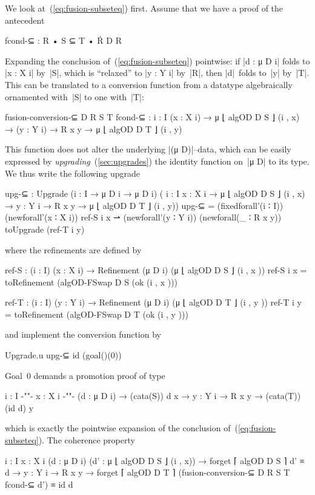 We look at~(\ref{eq:fusion-subseteq}) first.
Assume that we have a proof of the antecedent
\begin{code}
fcond-⊆ : R • S ⊆ T • Ṙ D R
\end{code}
Expanding the conclusion of~(\ref{eq:fusion-subseteq}) pointwise: if |d : μ D i| folds to |x : X i| by~|S|, which is ``relaxed'' to |y : Y i| by~|R|, then |d|~folds to~|y| by~|T|.
This can be translated to a conversion function from a datatype algebraically ornamented with~|S| to one with~|T|:
\begin{code}
fusion-conversion-⊆ D R S T fcond-⊆ :
  {i : I} (x : X i) → μ ⌊ algOD D S ⌋ (i , x) →
  (y : Y i) → R x y → μ ⌊ algOD D T ⌋ (i , y)
\end{code}
This function does not alter the underlying |(μ D)|--data, which can be easily expressed by \emph{upgrading}~(\autoref{sec:upgrades}) the identity function on~|μ D| to its type.
We thus write the following upgrade
\begin{code}
upg-⊆ : Upgrade  ({i : I} → μ D i → μ D i)
                 (  {i : I} {x : X i} → μ ⌊ algOD D S ⌋ (i , x) →
                    {y : Y i} → R x y  → μ ⌊ algOD D T ⌋ (i , y))
upg-⊆ =  (fixedforall'(i ∶ I)) (newforall'(x ∶ X i)) ref-S i x ⇀ 
         (newforall'(y ∶ Y i)) (newforall(_ ∶ R x y)) toUpgrade (ref-T i y)
\end{code}
where the refinements are defined by
\begin{code}
ref-S  : (i : I) (x : X  i) → Refinement (μ D i) (μ ⌊ algOD D S  ⌋ (i , x  ))
ref-S   i x  = toRefinement (algOD-FSwap D S  (ok (i , x  )))

ref-T  : (i : I) (y : Y  i) → Refinement (μ D i) (μ ⌊ algOD D T  ⌋ (i , y  ))
ref-T   i y  = toRefinement (algOD-FSwap D T  (ok (i , y  )))
\end{code}
and implement the conversion function by
\begin{code}
Upgrade.u upg-⊆ id (goal()(0))
\end{code}
Goal~0 demands a promotion proof of type
\begin{code}
{i : I} {-"\kern-1pt"-} {x : X i} {-"\kern-1pt"-} (d : μ D i) → (cata(S)) d x → {y : Y i} → R x y → (cata(T)) (id d) y
\end{code}
which is exactly the pointwise expansion of the conclusion of~(\ref{eq:fusion-subseteq}).
The coherence property
\begin{code}
{i : I} {x : X i} (d : μ D i) (d' : μ ⌊ algOD D S ⌋ (i , x)) →
  forget ⌈ algOD D S ⌉ d' ≡ d →
{y : Y i} → R x y →
  forget ⌈ algOD D T ⌉ (fusion-conversion-⊆ D R S T fcond-⊆ d') ≡ id d
\end{code}
